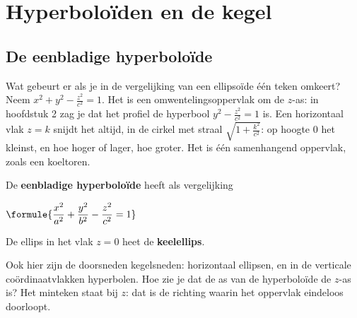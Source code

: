 \begin{oefeningen}
\end{oefeningen}

\section{Hyperboloïden en de kegel}

\subsection{De eenbladige hyperboloïde}

Wat gebeurt er als je in de vergelijking van een ellipsoïde één teken omkeert? Neem $x^2 + y^2 - \tfrac{z^2}{c^2} = 1$. Het is een omwentelingsoppervlak om de $z$-as: in hoofdstuk 2 zag je dat het profiel de hyperbool $y^2 - \tfrac{z^2}{c^2} = 1$ is. Een horizontaal vlak $z = k$ snijdt het altijd, in de cirkel met straal $\sqrt{1 + \tfrac{k^2}{c^2}}$: op hoogte 0 het kleinst, en hoe hoger of lager, hoe groter. Het is één samenhangend oppervlak, zoals een koeltoren.

\begin{theorie}
\begin{minipage}[t]{.7\linewidth}
\vspace{0pt}
De \textbf{\textcolor{accent}{eenbladige hyperboloïde}} heeft als vergelijking

\vspace{1mm}
\qquad $\formule{\dfrac{x^2}{a^2} + \dfrac{y^2}{b^2} - \dfrac{z^2}{c^2} = 1}$

\vspace{1mm}
De ellips in het vlak $z = 0$ heet de \textbf{\textcolor{accent}{keelellips}}.
\end{minipage}\hfill
\begin{minipage}[t]{.26\linewidth}
\vspace{0pt}
\centering
{}
\end{minipage}
\end{theorie}

Ook hier zijn de doorsneden kegelsneden: horizontaal ellipsen, en in de verticale coördinaatvlakken hyperbolen. Hoe zie je dat de as van de hyperboloïde de $z$-as is? Het minteken staat bij $z$: dat is de richting waarin het oppervlak eindeloos doorloopt.

